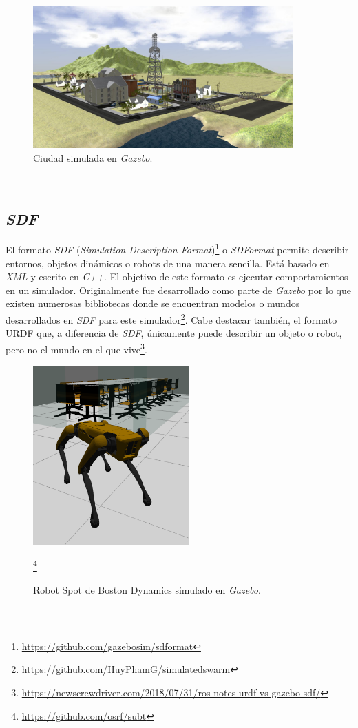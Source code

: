 \begin{figure} [h!]
	\begin{center}
		\includegraphics[width=10cm]{figs/city}
	\end{center}
	\caption{Ciudad simulada en \textit{Gazebo}.}
	\label{fig:city}
\end{figure}\

\subsection{\textit{SDF}}
\label{subsection:sdf}
El formato \textit{SDF} (\textit{Simulation Description Format})\footnote{\url{https://github.com/gazebosim/sdformat}} o \textit{SDFormat} permite describir entornos, objetos dinámicos o robots de una manera sencilla. Está basado en \textit{XML} y escrito en \textit{C++}. El objetivo de este formato es ejecutar comportamientos en un simulador. Originalmente fue desarrollado como parte de \textit{Gazebo} por lo que existen numerosas bibliotecas donde se encuentran modelos o mundos desarrollados en \textit{SDF} para este simulador\footnote{\url{https://github.com/HuyPhamG/simulatedswarm}}. Cabe destacar también, el formato URDF que, a diferencia de \textit{SDF}, únicamente puede describir un objeto o robot, pero no el mundo en el que vive\footnote{\url{https://newscrewdriver.com/2018/07/31/ros-notes-urdf-vs-gazebo-sdf/}}.\\

\begin{figure} [h!]
	\begin{center}
		\includegraphics[width=6cm]{figs/spot}
	\end{center}
	\caption{Robot Spot de Boston Dynamics simulado en \textit{Gazebo}.}\footnote{\url{https://github.com/osrf/subt}}
	\label{fig:spot}
\end{figure}\

